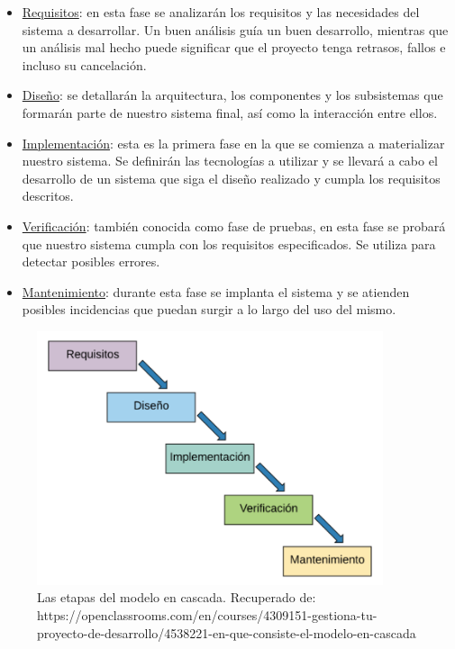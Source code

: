 \begin{itemize}
\item\underline{Requisitos}: en esta fase se analizarán los requisitos y las necesidades del sistema a desarrollar. Un buen análisis guía un buen desarrollo, mientras que un análisis mal hecho
puede significar que el proyecto tenga retrasos, fallos e incluso su cancelación.
\item\underline{Diseño}: se detallarán la arquitectura, los componentes y los subsistemas que formarán parte de nuestro sistema final, así como la interacción entre ellos.
\item\underline{Implementación}: esta es la primera fase en la que se comienza a materializar nuestro sistema. Se definirán las tecnologías a utilizar y se llevará a cabo el desarrollo de un sistema que siga
el diseño realizado y cumpla los requisitos descritos.
\item\underline{Verificación}: también conocida como fase de pruebas, en esta fase se probará que nuestro sistema cumpla con los requisitos especificados. Se utiliza para detectar posibles errores.
\item\underline{Mantenimiento}: durante esta fase se implanta el sistema y se atienden posibles incidencias que puedan surgir a lo largo del uso del mismo.

\end{itemize}

\begin{figure}[H]
\centering
\includegraphics[width=4.00in]{images/desarrollo_cascada.PNG}
\caption{Las etapas del modelo en cascada.
 Recuperado de: https://openclassrooms.com/en/courses/4309151-gestiona-tu-proyecto-de-desarrollo/4538221-en-que-consiste-el-modelo-en-cascada}
\label{fig:tecnologias_populares}
\end{figure}


